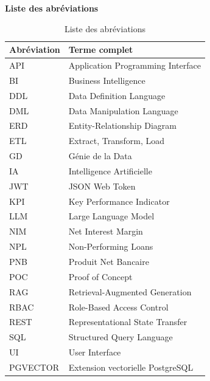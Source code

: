 \documentclass[a4paper,12pt]{report}
\begin{document}
\newpage
\thispagestyle{empty}
\begin{center}
    \textbf{\huge{Liste des abréviations}}
\end{center}
\vspace{1cm}
\begin{table}[H]
\centering
\begin{tabular}{|p{3.5cm}|p{10cm}|}
    \hline
    \textbf{Abréviation} & \textbf{Terme complet} \\
    \hline
    API & Application Programming Interface \\
    \hline
    BI & Business Intelligence \\
    \hline
    DDL & Data Definition Language \\
    \hline
    DML & Data Manipulation Language \\
    \hline
    ERD & Entity-Relationship Diagram \\
    \hline
    ETL & Extract, Transform, Load \\
    \hline
    GD & Génie de la Data \\
    \hline
    IA & Intelligence Artificielle \\
    \hline
    JWT & JSON Web Token \\
    \hline
    KPI & Key Performance Indicator \\
    \hline
    LLM & Large Language Model \\
    \hline
    NIM & Net Interest Margin \\
    \hline
    NPL & Non-Performing Loans \\
    \hline
    PNB & Produit Net Bancaire \\
    \hline
    POC & Proof of Concept \\
    \hline
    RAG & Retrieval-Augmented Generation \\
    \hline
    RBAC & Role-Based Access Control \\
    \hline
    REST & Representational State Transfer \\
    \hline
    SQL & Structured Query Language \\
    \hline
    UI & User Interface \\
    \hline
    PGVECTOR & Extension vectorielle PostgreSQL \\
    \hline
\end{tabular}
\caption{Liste des abréviations}
\label{tab:abbreviations}
\end{table}
\end{document}
